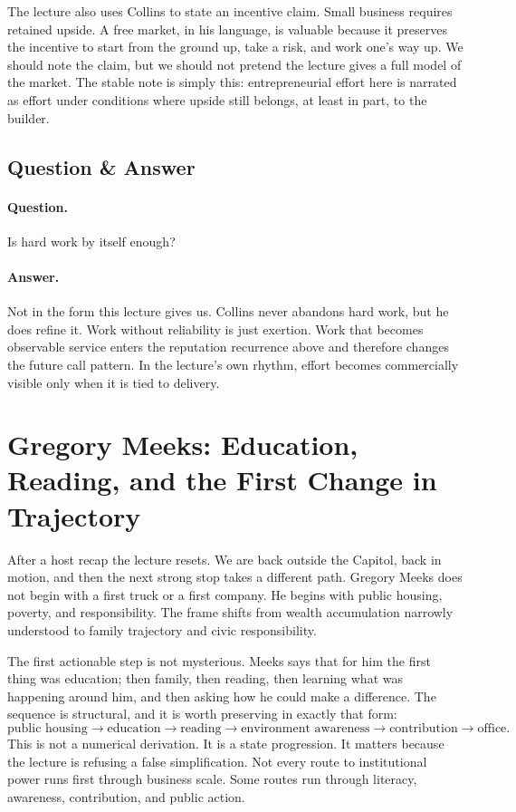The lecture also uses Collins to state an incentive claim. Small business requires retained upside. A free market, in his language, is valuable because it preserves the incentive to start from the ground up, take a risk, and work one's way up. We should note the claim, but we should not pretend the lecture gives a full model of the market. The stable note is simply this: entrepreneurial effort here is narrated as effort under conditions where upside still belongs, at least in part, to the builder.

\subsection{Question \& Answer}

\paragraph{Question.} Is hard work by itself enough?

\paragraph{Answer.} Not in the form this lecture gives us. Collins never abandons hard work, but he does refine it. Work without reliability is just exertion. Work that becomes observable service enters the reputation recurrence above and therefore changes the future call pattern. In the lecture's own rhythm, effort becomes commercially visible only when it is tied to delivery.

\section{Gregory Meeks: Education, Reading, and the First Change in Trajectory}

After a host recap the lecture resets. We are back outside the Capitol, back in motion, and then the next strong stop takes a different path. Gregory Meeks does not begin with a first truck or a first company. He begins with public housing, poverty, and responsibility. The frame shifts from wealth accumulation narrowly understood to family trajectory and civic responsibility.

The first actionable step is not mysterious. Meeks says that for him the first thing was education; then family, then reading, then learning what was happening around him, and then asking how he could make a difference. The sequence is structural, and it is worth preserving in exactly that form:
\begin{equation}
\text{public housing}\to
\text{education}\to
\text{reading}\to
\text{environment awareness}\to
\text{contribution}\to
\text{office}.
\end{equation}
This is not a numerical derivation. It is a state progression. It matters because the lecture is refusing a false simplification. Not every route to institutional power runs first through business scale. Some routes run through literacy, awareness, contribution, and public action.

